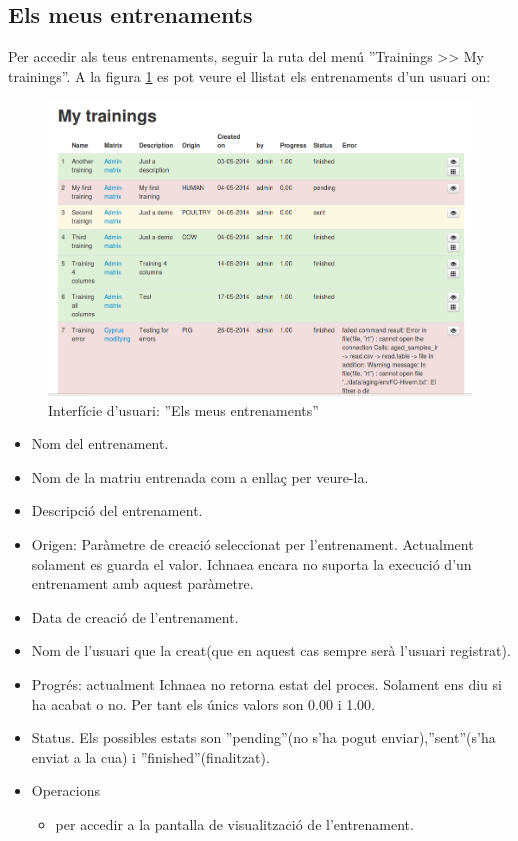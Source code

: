 \subsection{Els meus entrenaments}
\label{subsec:myTrainings}
Per accedir als teus entrenaments, seguir la ruta del menú ''Trainings >> My trainings''. A la figura \ref{fig:my_trainings} es pot veure el llistat els entrenaments d'un usuari on:
\begin{figure}[h!]
  \centering
  \includegraphics[scale=0.4]{img/userguide/my_trainings.png}
  \caption{Interfície d'usuari: ''Els meus entrenaments''}
  \label{fig:my_trainings}
\end{figure}

\begin{itemize}
\item Nom del entrenament.
\item Nom de la matriu entrenada com a enllaç per veure-la.
\item Descripci\'{o} del entrenament.
\item Origen: Paràmetre de creació seleccionat per l'entrenament. Actualment solament es guarda el valor. Ichnaea encara no suporta la execució d'un entrenament amb aquest paràmetre.
\item Data de creaci\'{o} de l'entrenament.
\item Nom de l'usuari que la creat(que en aquest cas sempre serà l'usuari registrat).
\item Progr\'{e}s: actualment Ichnaea no retorna estat del proces. Solament ens diu si ha acabat o no. Per tant els \'{u}nics valors son 0.00 i 1.00.
\item Status. Els possibles estats son ''pending''(no s'ha pogut enviar),''sent''(s'ha enviat a la cua) i ''finished''(finalitzat). 
\item Operacions
 \begin{itemize}
 \item \iconeyeopen per accedir a la pantalla de visualització de l'entrenament.
 \end{itemize}
\end{itemize}



